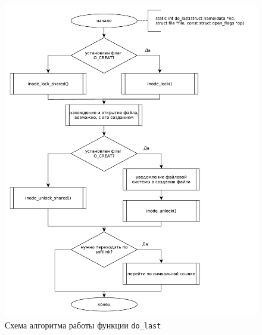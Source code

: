 \begin{figure}[h!btp]
	\centering
	\includegraphics[width=490pt]{inc/do_last.pdf}
	\caption{Схема алгоритма работы функции \texttt{do\_last}}
\end{figure}

\clearpage

